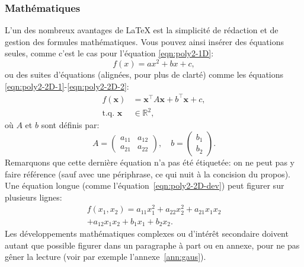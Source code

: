 \documentclass[twocolumn,10pt]{article}
\newcommand{\bsx}{\boldsymbol{x}}
\newcommand{\transp}[1]{{#1}^\top}
\begin{document}

\subsubsection{Mathématiques}\label{subsubsec:CR:maths}

L'un des nombreux avantages de \LaTeX{} est la simplicité de rédaction et de gestion des formules mathématiques. Vous pouvez ainsi insérer des équations seules, comme c'est le cas pour l'équation \eqref{eqn:poly2-1D}: 
\begin{equation}\label{eqn:poly2-1D}
f(x) = a x^2 + b x + c , 
\end{equation}
ou des suites d'équations (alignées, pour plus de clarté) comme les équations \eqref{eqn:poly2-2D-1}-\eqref{eqn:poly2-2D-2}: 
\begin{align}
\label{eqn:poly2-2D-1} f(\bsx) & = \transp{\bsx} A \bsx + \transp{b} \bsx + c , \\ 
\label{eqn:poly2-2D-2} \text{t.q. } \bsx & \in \mathbb{R}^2 , 
\end{align}
où $A$ et $b$ sont définis par: 
\begin{equation*}
A = \left(\begin{array}{cc}
a_{11} & a_{12} \\ 
a_{21} & a_{22} 
\end{array}\right) , 
\quad 
b = \left(\begin{array}{cc}
b_1 \\ 
b_2 
\end{array}\right) . 
\end{equation*}
Remarquons que cette dernière équation n'a pas été étiquetée: on ne peut pas y faire référence (sauf avec une périphrase, ce qui nuit à la concision du propos). 
Une équation longue (comme l'équation~\eqref{eqn:poly2-2D-dev}) peut figurer sur plusieurs lignes: 
\begin{multline}
\label{eqn:poly2-2D-dev} f(x_1,x_2) = a_{11} x_1^2 + a_{22} x_2^2 + a_{21} x_1 x_2 \\ + a_{12} x_1 x_2 + b_1 x_1 + b_2 x_2 . 
\end{multline}
Les développements mathématiques complexes ou d'intérêt secondaire doivent autant que possible figurer dans un paragraphe à part ou en annexe, pour ne pas gêner la lecture (voir par exemple l'annexe~\ref{ann:gaus}). 
\end{document}
